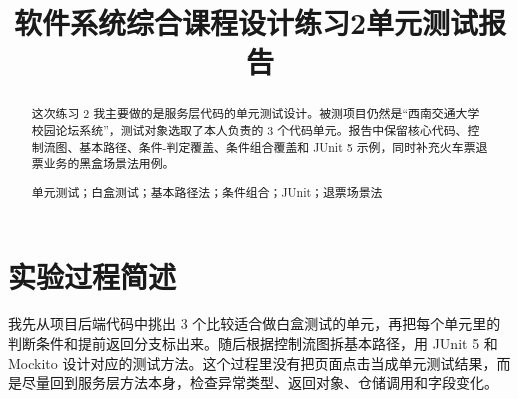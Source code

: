 \documentclass[bwprint]{report}
\title{软件系统综合课程设计练习2单元测试报告}
\begin{document}
\maketitle
\newpage
\pagestyle{plain}
\begin{abstract}
这次练习 2 我主要做的是服务层代码的单元测试设计。被测项目仍然是“西南交通大学校园论坛系统”，测试对象选取了本人负责的 3 个代码单元。报告中保留核心代码、控制流图、基本路径、条件-判定覆盖、条件组合覆盖和 JUnit 5 示例，同时补充火车票退票业务的黑盒场景法用例。

\vspace{0.5em}
单元测试；白盒测试；基本路径法；条件组合；JUnit；退票场景法
\end{abstract}
\tableofcontents
\newpage
\setcounter{page}{1}

\section{实验过程简述}
我先从项目后端代码中挑出 3 个比较适合做白盒测试的单元，再把每个单元里的判断条件和提前返回分支标出来。随后根据控制流图拆基本路径，用 JUnit 5 和 Mockito 设计对应的测试方法。这个过程里没有把页面点击当成单元测试结果，而是尽量回到服务层方法本身，检查异常类型、返回对象、仓储调用和字段变化。
\end{document}
